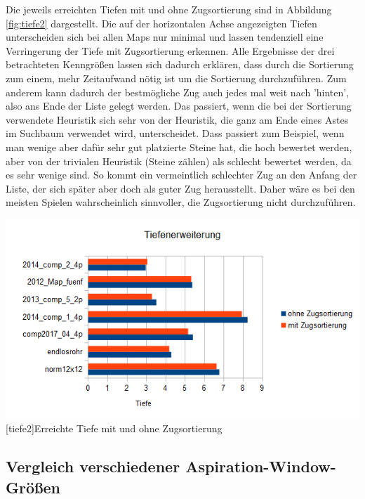 \documentclass[12pt,a4paper,bibliography=totocnumbered,listof=totocnumbered]{scrartcl}
\begin{document}
    Die jeweils erreichten Tiefen mit und ohne Zugsortierung sind in Abbildung \ref{fig:tiefe2} dargestellt. Die auf der horizontalen Achse angezeigten Tiefen unterscheiden sich bei allen Maps nur minimal und lassen tendenziell eine Verringerung der Tiefe mit Zugsortierung erkennen.\newline\newline
    Alle Ergebnisse der drei betrachteten Kenngrößen lassen sich dadurch erklären, dass durch die Sortierung zum einem, mehr Zeitaufwand nötig ist um die Sortierung durchzuführen. Zum anderem kann dadurch der bestmögliche Zug auch jedes mal weit nach 'hinten', also ans Ende der Liste gelegt werden. Das passiert, wenn die bei der Sortierung verwendete Heuristik sich sehr von der Heuristik, die ganz am Ende eines Astes im Suchbaum verwendet wird, unterscheidet. Dass passiert zum Beispiel, wenn man wenige aber dafür sehr gut platzierte Steine hat, die hoch bewertet werden, aber von der trivialen Heuristik (Steine zählen) als schlecht bewertet werden, da es sehr wenige sind.
    So kommt ein vermeintlich schlechter Zug an den Anfang der Liste, der sich später aber doch als guter Zug herausstellt.\newline
    Daher wäre es bei den meisten Spielen wahrscheinlich sinnvoller, die Zugsortierung nicht durchzuführen.
    
    \vspace{1em}
    \begin{minipage}{\linewidth}
    	\centering
    	\includegraphics[width=1\linewidth]{pics/Kapitel_4/TiefeZugSort.png}
    	[tiefe2]{Erreichte Tiefe mit und ohne Zugsortierung}
    	\label{fig:tiefe2}
    \end{minipage}
    \vspace{1em}
    

    \subsection{Vergleich verschiedener Aspiration-Window-Größen}
    
\end{document}
